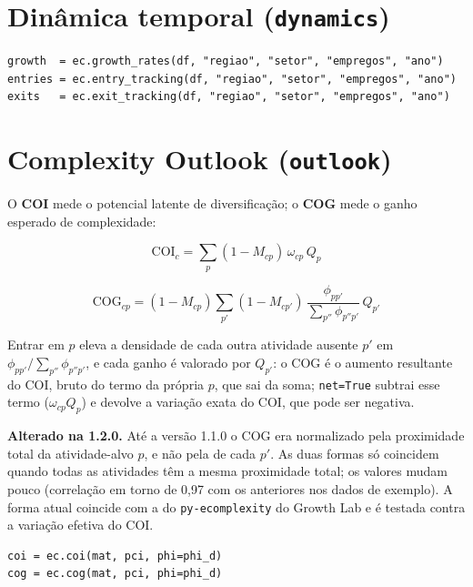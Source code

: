 \documentclass[12pt, a4paper]{article}
\begin{document}
\section{Din\^{a}mica temporal (\texttt{dynamics})}

\begin{lstlisting}[caption={Crescimento e rastreamento de entrada/sa\'{i}da}]
growth  = ec.growth_rates(df, "regiao", "setor", "empregos", "ano")
entries = ec.entry_tracking(df, "regiao", "setor", "empregos", "ano")
exits   = ec.exit_tracking(df, "regiao", "setor", "empregos", "ano")
\end{lstlisting}

\section{Complexity Outlook (\texttt{outlook})}

O \textbf{COI} mede o potencial latente de diversifica\c{c}\~{a}o;
o \textbf{COG} mede o ganho esperado de complexidade:

\[
  \text{COI}_c = \sum_p (1 - M_{cp})\,\omega_{cp}\,Q_p
\]

\[
  \text{COG}_{cp} = (1 - M_{cp}) \sum_{p'} (1 - M_{cp'})\,
     \frac{\phi_{pp'}}{\sum_{p''} \phi_{p''p'}}\,Q_{p'}
\]

Entrar em $p$ eleva a densidade de cada outra atividade ausente $p'$ em
$\phi_{pp'}/\sum_{p''}\phi_{p''p'}$, e cada ganho \'{e} valorado por
$Q_{p'}$: o COG \'{e} o aumento resultante do COI, bruto do termo da
pr\'{o}pria $p$, que sai da soma; \texttt{net=True} subtrai esse termo
($\omega_{cp} Q_p$) e devolve a varia\c{c}\~{a}o exata do COI, que pode
ser negativa.

\begin{notebox}
  \textbf{Alterado na 1.2.0.} At\'{e} a vers\~{a}o 1.1.0 o COG era
  normalizado pela proximidade total da atividade-alvo $p$, e n\~{a}o pela
  de cada $p'$. As duas formas s\'{o} coincidem quando todas as atividades
  t\^{e}m a mesma proximidade total; os valores mudam pouco
  (correla\c{c}\~{a}o em torno de 0,97 com os anteriores nos dados de
  exemplo). A forma atual coincide com a do \texttt{py-ecomplexity} do
  Growth Lab e \'{e} testada contra a varia\c{c}\~{a}o efetiva do COI.
\end{notebox}

\begin{lstlisting}[caption={COI e COG}]
coi = ec.coi(mat, pci, phi=phi_d)
cog = ec.cog(mat, pci, phi=phi_d)
\end{lstlisting}
\end{document}
